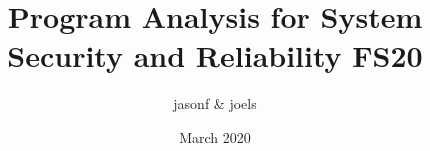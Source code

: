 \documentclass[a4paper, 8pt]{extarticle}
\title{Program Analysis for System Security and Reliability FS20}
\author{jasonf & joels }
\date{March 2020}
\begin{document}
\begin{multicols*}{2}
\maketitle
\tableofcontents










\end{multicols*}
\end{document}
